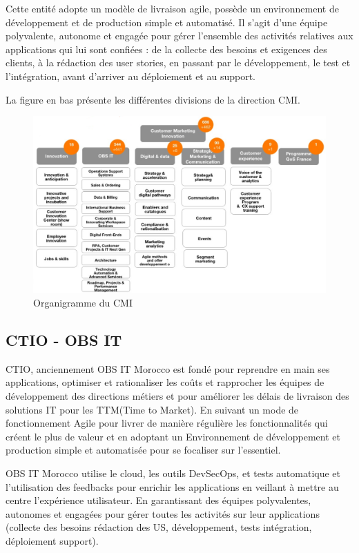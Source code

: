 \medskip

Cette entité adopte un modèle de livraison agile, possède un environnement 
de développement et de production simple et automatisé. Il s’agit d’une équipe
polyvalente, autonome et engagée pour gérer l’ensemble des activités relatives aux 
applications qui lui sont confiées : de la collecte des besoins et exigences des clients, à la
rédaction des user stories, en passant par le développement, le test et l’intégration, avant
d’arriver au déploiement et au support.

\clearpage

La figure en bas présente les différentes divisions de la direction CMI.

\begin{figure}[h]
    \centering
    \includegraphics[width=1\textwidth]{images/cmi_entity.png}
    \caption{Organigramme du CMI}
    \label{fig:cmi_organigrame}
\end{figure}

\subsection{CTIO - OBS IT}
CTIO, anciennement OBS IT Morocco est fondé pour reprendre en main ses applications, optimiser et
rationaliser les coûts et rapprocher les équipes de développement des directions métiers et
pour améliorer les délais de livraison des solutions IT pour les TTM(Time to Market). En suivant un mode
de fonctionnement Agile pour livrer de manière régulière les fonctionnalités qui créent le
plus de valeur et en adoptant un Environnement de développement et production simple
et automatisée pour se focaliser sur l’essentiel. 

OBS IT Morocco utilise le cloud, les outils DevSecOps, et tests automatique et l’utilisation des feedbacks pour enrichir 
les applications en veillant à mettre au centre l’expérience utilisateur. En garantissant des équipes
polyvalentes, autonomes et engagées pour gérer toutes les activités sur leur applications
(collecte des besoins rédaction des US, développement, tests intégration, déploiement
support).

